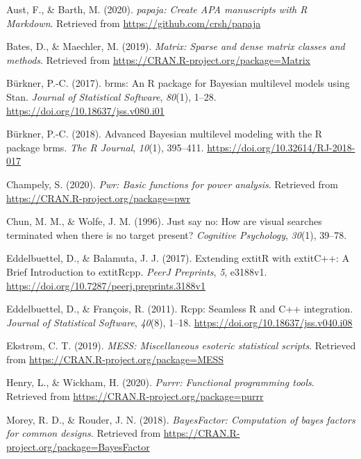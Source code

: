 \documentclass[
  english,
  man]{apa6}
\begin{document}
\hypertarget{refs}{}
\leavevmode\hypertarget{ref-R-papaja}{}%
Aust, F., \& Barth, M. (2020). \emph{papaja: Create APA manuscripts with R Markdown}. Retrieved from \url{https://github.com/crsh/papaja}

\leavevmode\hypertarget{ref-R-Matrix}{}%
Bates, D., \& Maechler, M. (2019). \emph{Matrix: Sparse and dense matrix classes and methods}. Retrieved from \url{https://CRAN.R-project.org/package=Matrix}

\leavevmode\hypertarget{ref-R-brms_a}{}%
Bürkner, P.-C. (2017). brms: An R package for Bayesian multilevel models using Stan. \emph{Journal of Statistical Software}, \emph{80}(1), 1--28. \url{https://doi.org/10.18637/jss.v080.i01}

\leavevmode\hypertarget{ref-R-brms_b}{}%
Bürkner, P.-C. (2018). Advanced Bayesian multilevel modeling with the R package brms. \emph{The R Journal}, \emph{10}(1), 395--411. \url{https://doi.org/10.32614/RJ-2018-017}

\leavevmode\hypertarget{ref-R-pwr}{}%
Champely, S. (2020). \emph{Pwr: Basic functions for power analysis}. Retrieved from \url{https://CRAN.R-project.org/package=pwr}

\leavevmode\hypertarget{ref-chun1996just}{}%
Chun, M. M., \& Wolfe, J. M. (1996). Just say no: How are visual searches terminated when there is no target present? \emph{Cognitive Psychology}, \emph{30}(1), 39--78.

\leavevmode\hypertarget{ref-R-Rcpp_b}{}%
Eddelbuettel, D., \& Balamuta, J. J. (2017). Extending extitR with extitC++: A Brief Introduction to extitRcpp. \emph{PeerJ Preprints}, \emph{5}, e3188v1. \url{https://doi.org/10.7287/peerj.preprints.3188v1}

\leavevmode\hypertarget{ref-R-Rcpp_a}{}%
Eddelbuettel, D., \& François, R. (2011). Rcpp: Seamless R and C++ integration. \emph{Journal of Statistical Software}, \emph{40}(8), 1--18. \url{https://doi.org/10.18637/jss.v040.i08}

\leavevmode\hypertarget{ref-R-MESS}{}%
Ekstrøm, C. T. (2019). \emph{MESS: Miscellaneous esoteric statistical scripts}. Retrieved from \url{https://CRAN.R-project.org/package=MESS}

\leavevmode\hypertarget{ref-R-purrr}{}%
Henry, L., \& Wickham, H. (2020). \emph{Purrr: Functional programming tools}. Retrieved from \url{https://CRAN.R-project.org/package=purrr}

\leavevmode\hypertarget{ref-R-BayesFactor}{}%
Morey, R. D., \& Rouder, J. N. (2018). \emph{BayesFactor: Computation of bayes factors for common designs}. Retrieved from \url{https://CRAN.R-project.org/package=BayesFactor}
\end{document}
